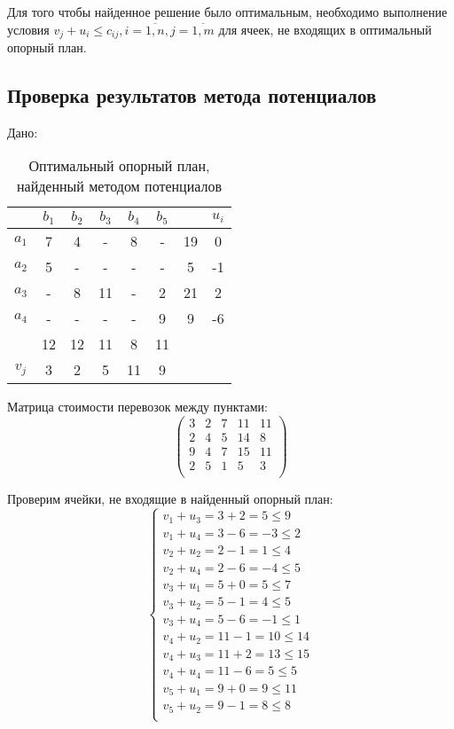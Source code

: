 \documentclass[../body.tex]{subfiles}
\begin{document}
Для того чтобы найденное решение было оптимальным, необходимо выполнение условия $v_j+u_i \leq c_{ij}, i=\overline{1,n}, j=\overline{1,m}$ для ячеек, не входящих в оптимальный опорный план.
\subsection{Проверка результатов метода потенциалов}
Дано:
\begin{table}[h]
    \centering
    \begin{tabular}{|c|c|c|c|c|c||c||c|}
        \hline
        & $b_1$ & $b_2$ & $b_3$ & $b_4$ & $b_5$ & & $u_i$ \\\hline
        $a_1$ & 7 & 4 & - & 8 & - & 19 & 0\\\hline
        $a_2$ & 5 & - & - & - & - & 5 & -1\\\hline
        $a_3$ & - & 8 & 11 & - & 2 & 21 & 2\\\hline
        $a_4$ & - & - & - & - & 9 & 9 & -6\\\hline
        & 12 & 12 & 11 & 8 & 11 & &\\\hline
        \hline
        $v_j$ & 3 & 2 & 5 & 11 & 9 & &\\\hline
    \end{tabular}
    \caption{Оптимальный опорный план, найденный методом потенциалов}
    \label{tab:potentials}
\end{table}

Матрица стоимости перевозок между пунктами:
$$\begin{pmatrix}
    3 & 2 & 7 & 11 & 11\\
    2 & 4 & 5 & 14 & 8\\
    9 & 4 & 7 & 15 & 11\\
    2 & 5 & 1 & 5 & 3\\
\end{pmatrix}$$

Проверим ячейки, не входящие в найденный опорный план:
\begin{equation}
    \left\{
    \begin{array}{ll}
         v_1 + u_3 = 3 + 2 = 5 \leq 9\\
         v_1 + u_4 = 3 - 6 = -3 \leq 2\\ 
         v_2 + u_2 = 2 - 1 = 1 \leq 4\\
         v_2 + u_4 = 2 - 6 = -4 \leq 5\\
         v_3 + u_1 = 5 + 0 = 5 \leq 7\\
         v_3 + u_2 = 5 - 1 = 4 \leq 5\\
         v_3 + u_4 = 5 - 6 = -1 \leq 1\\
         v_4 + u_2 = 11 - 1 = 10 \leq 14\\
         v_4 + u_3 = 11 + 2 = 13 \leq 15\\
         v_4 + u_4 = 11 - 6 = 5 \leq 5\\
         v_5 + u_1 = 9 + 0 = 9 \leq 11\\
         v_5 + u_2 = 9 - 1 = 8 \leq 8\\
    \end{array}
    \right.
\end{equation}
\end{document}
